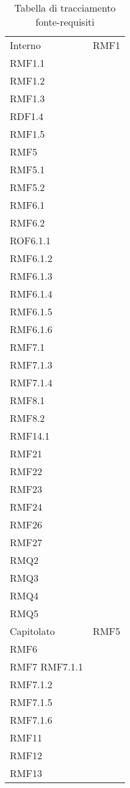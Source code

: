 \setlength{\tabcolsep}{10pt}
\begin{longtable}[h!] { >{\centering}m{5cm} >{\centering}m{5cm} }
	\caption{Tabella di tracciamento fonte-requisiti} \\
	\rowcolor{lightgray}
	\thead{Fonte} & \thead{Requisiti} \\ \endhead%


	 Interno & RMF1 \\
	 RMF1.1 \\
	 RMF1.2 \\
	 RMF1.3 \\
	 RDF1.4 \\
	 RMF1.5 \\
	 RMF5 \\
	 RMF5.1 \\
	 RMF5.2 \\
	 RMF6.1 \\
	 RMF6.2 \\
	 ROF6.1.1 \\
	 RMF6.1.2 \\
	 RMF6.1.3 \\
	 RMF6.1.4 \\
	 RMF6.1.5 \\
	 RMF6.1.6 \\
	 RMF7.1 \\
	 RMF7.1.3 \\
	 RMF7.1.4 \\
	 RMF8.1 \\
	 RMF8.2 \\
	 RMF14.1 \\
	 RMF21 \\
	 RMF22 \\
	 RMF23 \\
	 RMF24 \\
	 RMF26 \\
	 RMF27 \\
	 RMQ2 \\
	 RMQ3 \\
	 RMQ4 \\
	 RMQ5
	 \tabularnewline
	 Capitolato & RMF5 \\
	 RMF6 \\
	 RMF7
	 RMF7.1.1\\
	 RMF7.1.2 \\
	 RMF7.1.5 \\
	 RMF7.1.6 \\
	 RMF11 \\
	 RMF12 \\
	 RMF13 \\

\end{longtable}
